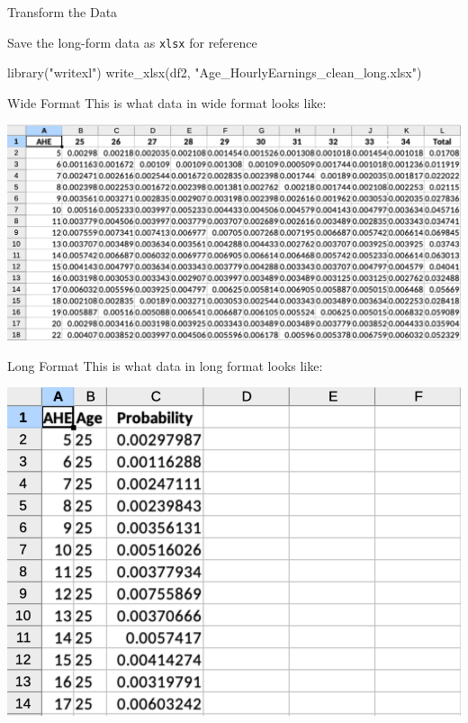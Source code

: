 \documentclass[
  11pt,
  ignorenonframetext,
  svgnames, handout, t]{beamer}
\newenvironment{Shaded}{\begin{snugshade}}{\end{snugshade}}
\newcommand{\FunctionTok}[1]{\textcolor[rgb]{0.00,0.00,0.00}{#1}}
\newcommand{\NormalTok}[1]{#1}
\newcommand{\StringTok}[1]{\textcolor[rgb]{0.31,0.60,0.02}{#1}}
\begin{document}
\begin{frame}[fragile]{Transform the Data}
\normalsize

Save the long-form data as \texttt{xlsx} for reference

\footnotesize

\begin{Shaded}
\begin{Highlighting}[]
\FunctionTok{library}\NormalTok{(}\StringTok{"writexl"}\NormalTok{)}
\FunctionTok{write\_xlsx}\NormalTok{(df2, }\StringTok{"Age\_HourlyEarnings\_clean\_long.xlsx"}\NormalTok{)}
\end{Highlighting}
\end{Shaded}

\normalsize
\end{frame}

\begin{frame}{Wide Format}
\protect\hypertarget{wide-format}{}
This is what data in wide format looks like:

\includegraphics{data-wide-format.pdf}
\end{frame}

\begin{frame}{Long Format}
\protect\hypertarget{long-format}{}
This is what data in long format looks like:

\includegraphics{data-long-format.pdf}
\end{frame}
\end{document}
